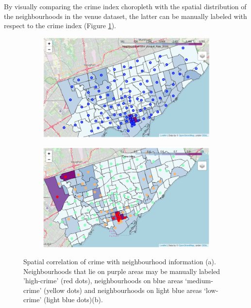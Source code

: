 \documentclass{article}
\begin{document}
By visually comparing the crime index choropleth with the spatial distribution of the neighbourhoods in the venue dataset, the latter can be manually labeled with respect to the crime index (Figure \ref{fig:manual}). 
\begin{figure}[ht]
    \begin{subfigure}[b]{0.47\textwidth}
        \includegraphics[width=\textwidth]{pics/manual.png}
        \caption{}
    \end{subfigure}\hfill
    \begin{subfigure}[b]{0.47\textwidth}
        \includegraphics[width=\textwidth]{pics/manual2.png}
        \caption{}
    \end{subfigure}
    \caption{Spatial correlation of crime with neighbourhood information (a). Neighbourhoods that lie on purple areas may be manually labeled 'high-crime' (red dots), neighbourhoods on blue areas `medium-crime' (yellow dots) and neighbourhoods on light blue areas `low-crime' (light blue dots)(b).}\label{fig:manual}
\end{figure}
\end{document}
